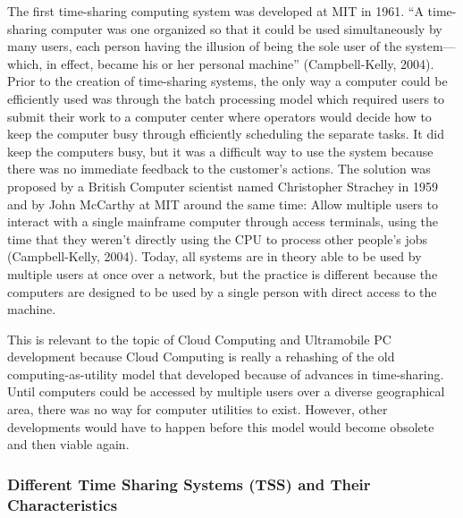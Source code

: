 \documentclass[12pt,oneside,letterpaper]{article}
\begin{document}
The first time-sharing computing system was developed at MIT in 1961.  ``A
time-sharing computer was one organized so that it could be used simultaneously
by many users, each person having the illusion of being the sole user of the
system---which, in effect, became his or her personal machine'' (Campbell-Kelly,
2004).  Prior to the creation of time-sharing systems, the only way a computer
could be efficiently used was through the batch processing model which required
users to submit their work to a computer center where operators would decide how
to keep the computer busy through efficiently scheduling the separate tasks.  It
did keep the computers busy, but it was a difficult way to use the system
because there was no immediate feedback to the customer's actions.  The solution
was proposed by a British Computer scientist named Christopher Strachey in 1959
and by John McCarthy at MIT around the same time: Allow multiple users to
interact with a single mainframe computer through access terminals, using the
time that they weren't directly using the CPU to process other people's jobs
(Campbell-Kelly, 2004).  Today, all systems are in theory able to be used by
multiple users at once over a network, but the practice is different because the
computers are designed to be used by a single person with direct access to the
machine.

This is relevant to the topic of Cloud Computing and Ultramobile PC development
because Cloud Computing is really a rehashing of the old computing-as-utility
model that developed because of advances in time-sharing.  Until computers could
be accessed by multiple users over a diverse geographical area, there was no way
for computer utilities to exist.  However, other developments would have to
happen before this model would become obsolete and then viable again.

\subsubsection{Different Time Sharing Systems (TSS) and Their Characteristics}
\end{document}
